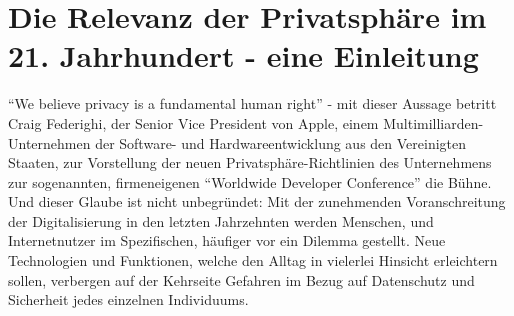 \chapter{Die Relevanz der Privatsphäre im 21. Jahrhundert - eine Einleitung} %
\label{Introduction} %

\enquote{We believe privacy is a fundamental human right} \cite{Craig1} - mit dieser Aussage betritt Craig Federighi, der Senior Vice President von Apple, einem Multimilliarden-Unternehmen der Software- und Hardwareentwicklung aus den Vereinigten Staaten, zur Vorstellung der neuen Privatsphäre-Richtlinien
des Unternehmens zur sogenannten, firmeneigenen \enquote{Worldwide Developer Conference} die Bühne. \\ Und dieser Glaube ist nicht unbegründet: Mit der zunehmenden Voranschreitung der Digitalisierung in den letzten Jahrzehnten werden Menschen, und Internetnutzer im Spezifischen, häufiger vor ein Dilemma gestellt.
Neue Technologien und Funktionen, welche den Alltag in vielerlei Hinsicht erleichtern sollen, verbergen auf der Kehrseite Gefahren im Bezug auf Datenschutz und Sicherheit jedes einzelnen Individuums.
